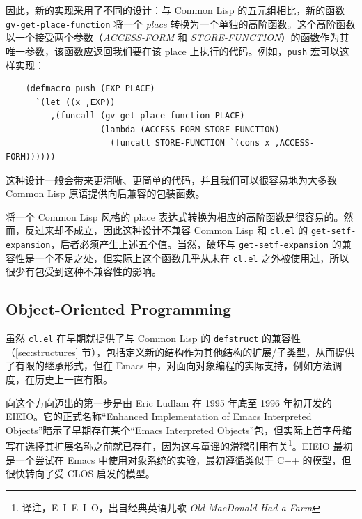 \documentclass[format=acmsmall,screen]{acmart}
\begin{document}
因此，新的实现采用了不同的设计：与 Common Lisp 的五元组相比，新的函数 \texttt{gv-get-place-function} 将一个 \emph{place} 转换为一个单独的高阶函数。这个高阶函数以一个接受两个参数（\textsl{ACCESS-FORM} 和 \textsl{STORE-FUNCTION}）的函数作为其唯一参数，该函数应返回我们要在该 place 上执行的代码。例如，\texttt{push} 宏可以这样实现：

\begin{verbatim}
    (defmacro push (EXP PLACE)
      `(let ((x ,EXP))
         ,(funcall (gv-get-place-function PLACE)
                   (lambda (ACCESS-FORM STORE-FUNCTION)
                     (funcall STORE-FUNCTION `(cons x ,ACCESS-FORM))))))
\end{verbatim}

这种设计一般会带来更清晰、更简单的代码，并且我们可以很容易地为大多数 Common Lisp 原语提供向后兼容的包装函数。

将一个 Common Lisp 风格的 place 表达式转换为相应的高阶函数是很容易的。然而，反过来却不成立，因此这种设计不兼容 Common Lisp 和 \texttt{cl.el} 的 \texttt{get-setf-expansion}，后者必须产生上述五个值。当然，破坏与 \texttt{get-setf-expansion} 的兼容性是一个不足之处，但实际上这个函数几乎从未在 \texttt{cl.el} 之外被使用过，所以很少有包受到这种不兼容性的影响。

\subsection{Object-Oriented Programming} %
\label{sec:oop}

虽然 \texttt{cl.el} 在早期就提供了与 Common Lisp 的 \texttt{defstruct} 的兼容性（\ref{sec:structures} 节），包括定义新的结构作为其他结构的扩展/子类型，从而提供了有限的继承形式，但在 Emacs 中，对面向对象编程的实际支持，例如方法调度，在历史上一直有限。

向这个方向迈出的第一步是由 Eric Ludlam 在 1995 年底至 1996 年初开发的 EIEIO。它的正式名称“Enhanced Implementation of Emacs Interpreted Objects”暗示了早期存在某个“Emacs Interpreted Objects”包，但实际上首字母缩写在选择其扩展名称之前就已存在，因为这与童谣的滑稽引用有关\footnote{译注，E~I~E~I~O，出自经典英语儿歌 \emph{Old MacDonald Had a Farm}}。EIEIO 最初是一个尝试在 Emacs 中使用对象系统的实验，最初遵循类似于 C++ 的模型，但很快转向了受 CLOS 启发的模型。
\end{document}
